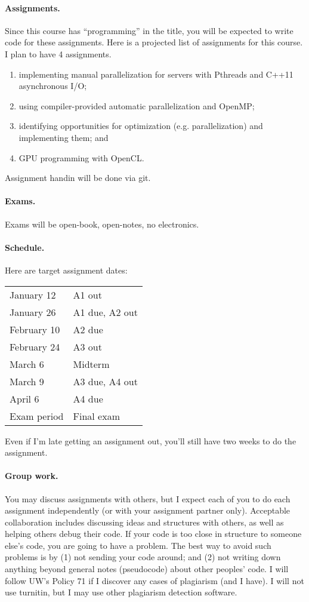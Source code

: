 \documentclass{article}
\begin{document}
\paragraph{Assignments.} Since this course has ``programming'' in the 
title, you will be expected to write code for these assignments.  Here
is a projected list of assignments for this course. I plan to have 4
assignments.
\begin{enumerate}
\item implementing manual parallelization for servers with Pthreads and C++11 asynchronous I/O;
\item using compiler-provided automatic parallelization and OpenMP;
\item identifying opportunities for optimization (e.g. parallelization) and implementing them; and
\item GPU programming with OpenCL.
\end{enumerate}
Assignment handin will be done via git.

\paragraph{Exams.} Exams will be open-book, open-notes, no electronics.

\paragraph{Schedule.} 
Here are target assignment dates:

\begin{tabular}{ll}
January 12  & A1 out\\
January 26  & A1 due, A2 out\\
February 10 & A2 due\\
February 24 & A3 out\\
March 6 & Midterm\\
March 9    & A3 due, A4 out\\
April 6    & A4 due\\
Exam period & Final exam
\end{tabular}

\noindent Even if I'm late getting an assignment out, you'll still have two weeks to do the assignment. 

\paragraph{Group work.} 
You may discuss assignments with others, but I expect each of you to
do each assignment independently (or with your assignment partner only). Acceptable collaboration includes
discussing ideas and structures with others, as well as helping others
debug their code. If your code is too close in structure to someone
else's code, you are going to have a problem. The best way to avoid
such problems is by (1) not sending your code around; and (2) not
writing down anything beyond general notes (pseudocode) about other
peoples' code. I will follow UW's Policy 71 if I discover any cases of
plagiarism (and I have). I will not use turnitin, but I may use other
plagiarism detection software.
\end{document}
